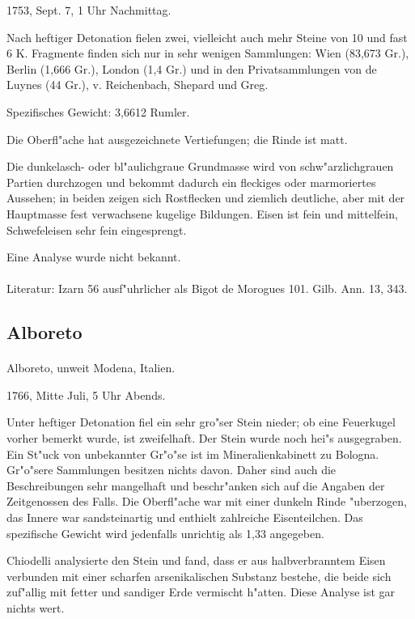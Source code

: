 \documentclass[a4paper, 11pt, oneside]{article}
\begin{document}
1753, Sept. 7, 1 Uhr Nachmittag.

Nach heftiger Detonation fielen zwei, vielleicht auch mehr Steine von 10 und fast 6 K. Fragmente finden sich nur in sehr wenigen Sammlungen: Wien (83,673 Gr.), Berlin (1,666 Gr.), London (1,4 Gr.) und in den Privatsammlungen von de Luynes (44 Gr.), v. Reichenbach, Shepard und Greg.

Spezifisches Gewicht: 3,6612 Rumler.

Die Oberfl"ache hat ausgezeichnete Vertiefungen; die Rinde ist matt.

Die dunkelasch- oder bl"aulichgraue Grundmasse wird von schw"arzlichgrauen Partien durchzogen und bekommt dadurch ein fleckiges oder marmoriertes Aussehen; in beiden zeigen sich Rostflecken und ziemlich deutliche, aber mit der Hauptmasse fest verwachsene kugelige Bildungen. Eisen ist fein und mittelfein, Schwefeleisen sehr fein eingesprengt.

Eine Analyse wurde nicht bekannt.
\footnotesize
\paragraph{}
Literatur: Izarn 56 ausf"uhrlicher als Bigot de Morogues 101. Gilb. Ann. 13, 343.
\subsection{Alboreto}
\normalsize
\paragraph{}
Alboreto, unweit Modena, Italien.

1766, Mitte Juli, 5 Uhr Abends.

Unter heftiger Detonation fiel ein sehr gro"ser Stein nieder; ob eine Feuerkugel vorher bemerkt wurde, ist zweifelhaft. Der Stein wurde noch hei"s ausgegraben. Ein St"uck von unbekannter Gr"o"se ist im Mineralienkabinett zu Bologna. Gr"o"sere Sammlungen besitzen nichts davon. Daher sind auch die Beschreibungen sehr mangelhaft und beschr"anken sich auf die Angaben der Zeitgenossen des Falls. Die Oberfl"ache war mit einer dunkeln Rinde "uberzogen, das Innere war sandsteinartig und enthielt zahlreiche Eisenteilchen. Das spezifische Gewicht wird jedenfalls unrichtig als 1,33 angegeben.

Chiodelli analysierte den Stein und fand, dass er aus halbverbranntem Eisen verbunden mit einer scharfen arsenikalischen Substanz bestehe, die beide sich zuf"allig mit fetter und sandiger Erde vermischt h"atten. Diese Analyse ist gar nichts wert.
\footnotesize
\end{document}
